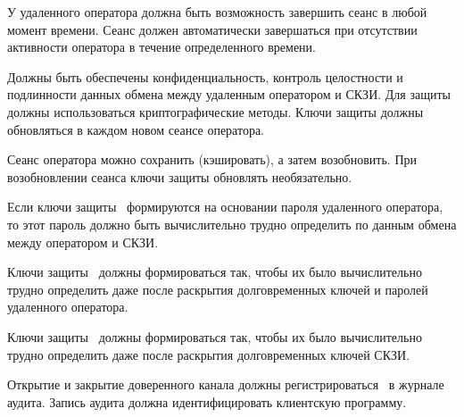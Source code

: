 \label{R.TC.Logout} %
У удаленного оператора должна быть возможность завершить сеанс в любой момент 
времени. Сеанс должен автоматически завершаться при отсутствии активности 
оператора в течение определенного времени.

\label{R.TC.Crypto} %
Должны быть обеспечены конфиденциальность, контроль целостности и подлинности 
данных обмена между удаленным оператором и СКЗИ.
%
Для защиты должны использоваться криптографические методы.
%
Ключи защиты должны обновляться в каждом новом сеансе оператора.

\begin{note*}
Сеанс оператора можно сохранить (кэшировать), а затем возобновить.
При возобновлении сеанса ключи защиты обновлять необязательно.
\end{note*}

%

\label{R.TC.Pwd} %
Если ключи защиты~ формируются на основании 
пароля удаленного оператора, то этот пароль должно быть вычислительно
трудно определить по данным обмена между оператором и СКЗИ.

\label{R.TC.FSWeak} %
Ключи защиты~ должны формироваться так, чтобы их было
вычислительно трудно определить даже после раскрытия долговременных ключей и
паролей удаленного оператора.

\label{R.TC.FS} %
Ключи защиты~ должны формироваться так, чтобы их было
вычислительно трудно определить даже после раскрытия долговременных ключей СКЗИ.

\label{R.TC.AU} %
Открытие и закрытие доверенного канала должны регистрироваться~ 
в журнале аудита. Запись аудита должна идентифицировать клиентскую программу.

